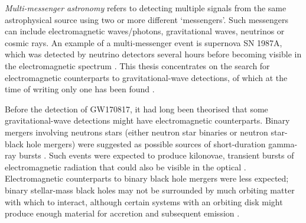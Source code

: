 \begin{colsection}

\emph{Multi-messenger astronomy} refers to detecting multiple signals from the same astrophysical source using two or more different `messengers'. Such messengers can include electromagnetic waves/photons, gravitational waves, neutrinos or cosmic rays. An example of a multi-messenger event is supernova SN 1987A, which was detected by neutrino detectors several hours before becoming visible in the electromagnetic spectrum \citep{SN1987A}. This thesis concentrates on the search for electromagnetic counterparts to gravitational-wave detections, of which at the time of writing only one has been found \citep[GW170817;][]{GW170817}.

Before the detection of GW170817, it had long been theorised that some gravitational-wave detections might have electromagnetic counterparts. Binary mergers involving neutrons stars (either neutron star binaries or neutron star-black hole mergers) were suggested as possible sources of short-duration gamma-ray bursts \citep{SGRBs}. Such events were expected to produce kilonovae, transient bursts of electromagnetic radiation that could also be visible in the optical \citep[these events were named ``kilo''-novae as they were predicted to reach luminosities approximately 1000 times that of a classical nova;][]{GW_kilonova}. Electromagnetic counterparts to binary black hole mergers were less expected; binary stellar-mass black holes may not be surrounded by much orbiting matter with which to interact, although certain systems with an orbiting disk might produce enough material for accretion and subsequent emission \citep{BBH_EM}.

\end{colsection}



